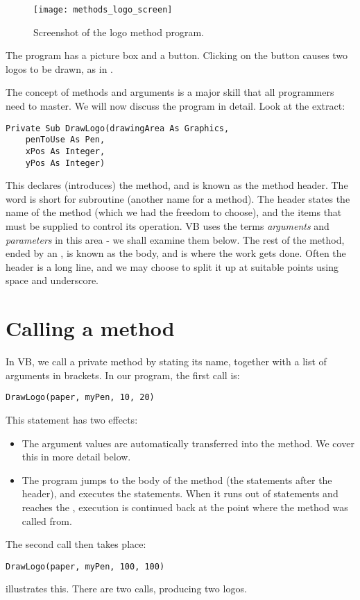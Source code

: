		\begin{figure}[ht]
			\centering
			\texttt{[image: methods\_logo\_screen]}
			\caption{Screenshot of the logo method program.}
			\label{fig:methods_logo_screen}
		\end{figure}


		The program has a picture box and a button. Clicking on the button causes two logos to be drawn, as in .
		
		The concept of methods and arguments is a major skill that all programmers need to master. We will now discuss the program in detail. Look at the extract:
		\begin{lstlisting}
Private Sub DrawLogo(drawingArea As Graphics,
	penToUse As Pen,
	xPos As Integer,
	yPos As Integer)
		\end{lstlisting}
		This declares (introduces) the method, and is known as the method header. The word  is short for subroutine (another name for a method). The header states the name of the method (which we had the freedom to choose), and the items that must be supplied to control its operation. VB uses the terms \emph{arguments} and \emph{parameters} in this area - we shall examine them below. The rest of the method, ended by an , is known as the body, and is where the work gets done. Often the header is a long line, and we may choose to split it up at suitable points using space and underscore.
		
	\section{Calling a method}
		In VB, we call a private method by stating its name, together with a list of arguments in brackets. In our program, the first call is:
		\begin{lstlisting}
DrawLogo(paper, myPen, 10, 20)
		\end{lstlisting}
This statement has two effects:
		\begin{itemize}
			\item The argument values are automatically transferred into the method. We cover this in more detail below.
			\item The program jumps to the body of the method (the statements after the header), and executes the statements. When it runs out of statements and reaches the , execution is continued back at the point where the method was called from.
		\end{itemize}
The second call then takes place:
		\begin{lstlisting}
DrawLogo(paper, myPen, 100, 100)
		\end{lstlisting}
		 illustrates this. There are two calls, producing two logos.

